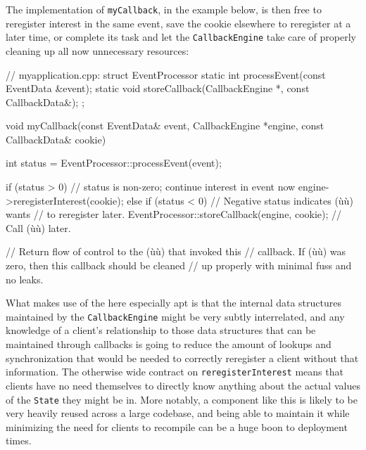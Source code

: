 \noindent The implementation of \lstinline!myCallback!, in the example below, is then
free to reregister interest in the same event, save the cookie elsewhere
to reregister at a later time, or complete its task and let the
\lstinline!CallbackEngine! take care of properly cleaning up all now
unnecessary resources:

\begin{emcppshiddenlisting}[emcppsbatch=e6]
// myapplication.cpp:
struct EventProcessor {
    static int processEvent(const EventData &event);
    static void storeCallback(CallbackEngine *, const CallbackData&);
};
\end{emcppshiddenlisting}
\begin{emcppslisting}[emcppsbatch=e6,emcppsoutputfile=myapplication.cpp]
void myCallback(const EventData&     event,
                CallbackEngine      *engine,
                const CallbackData&  cookie)
{
    int status = EventProcessor::processEvent(event);

    if (status > 0)  // status is non-zero; continue interest in event now
    {
        engine->reregisterInterest(cookie);
    }
    else if (status < 0)  // Negative status indicates (ù{}ù) wants
                          // to reregister later.
    {
        EventProcessor::storeCallback(engine, cookie);
                          // Call (ù{}ù) later.
    }

    // Return flow of control to the (ù{}ù) that invoked this
    // callback.  If (ù{}ù) was zero, then this callback should be cleaned
    // up properly with minimal fuss and no leaks.
}
\end{emcppslisting}

\noindent What makes use of the  here especially apt is
that the internal data structures maintained by the
\lstinline!CallbackEngine! might be very subtly interrelated, and any
knowledge of a client's relationship to those data structures that can
be maintained through callbacks is going to reduce the amount of lookups
and synchronization that would be needed to correctly reregister a
client without that information. The otherwise wide contract on
\lstinline!reregisterInterest! means that clients have no need themselves
to directly know anything about the actual values of the \lstinline!State!
they might be in. More notably, a component like this is likely to be
very heavily reused across a large codebase, and being able to maintain
it while minimizing the need for clients to recompile can be a huge boon
to deployment times.

